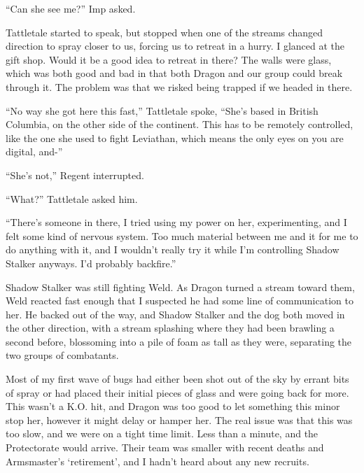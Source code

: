 ``Can she see me?'' Imp asked.



Tattletale started to speak, but stopped when one of the streams changed direction to spray closer to us, forcing us to retreat in a hurry.  I glanced at the gift shop.  Would it be a good idea to retreat in there?  The walls were glass, which was both good and bad in that both Dragon and our group could break through it.  The problem was that we risked being trapped if we headed in there.



``No way she got here this fast,'' Tattletale spoke, ``She's based in British Columbia, on the other side of the continent.  This has to be remotely controlled, like the one she used to fight Leviathan, which means the only eyes on you are digital, and-''



``She's not,'' Regent interrupted.



``What?'' Tattletale asked him.



``There's someone in there, I tried using my power on her, experimenting, and I felt some kind of nervous system.  Too much material between me and it for me to do anything with it, and I wouldn't really try it while I'm controlling Shadow Stalker anyways.  I'd probably backfire.''



Shadow Stalker was still fighting Weld.  As Dragon turned a stream toward them, Weld reacted fast enough that I suspected he had some line of communication to her.  He backed out of the way, and Shadow Stalker and the dog both moved in the other direction, with a stream splashing where they had been brawling a second before, blossoming into a pile of foam as tall as they were, separating the two groups of combatants.



Most of my first wave of bugs had either been shot out of the sky by errant bits of spray or had placed their initial pieces of glass and were going back for more.  This wasn't a K.O. hit, and Dragon was too good to let something this minor stop her, however it might delay or hamper her.  The real issue was that this was too slow, and we were on a tight time limit.  Less than a minute, and the Protectorate would arrive.  Their team was smaller with recent deaths and Armsmaster's `retirement', and I hadn't heard about any new recruits.



